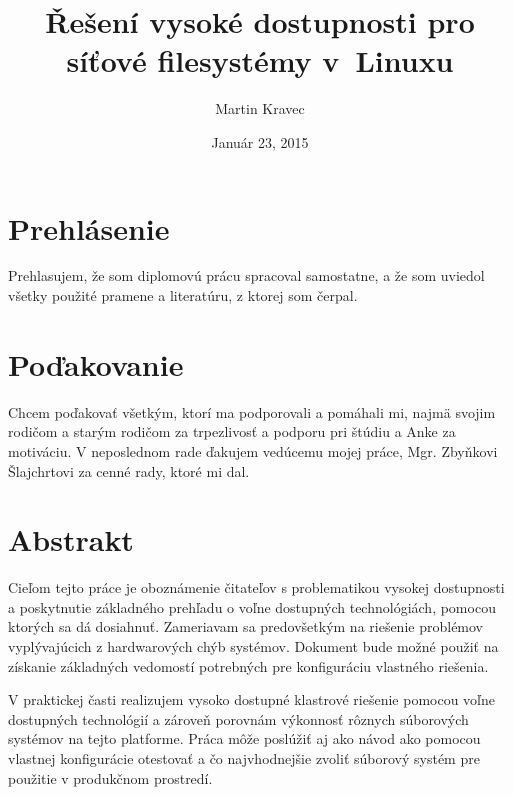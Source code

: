 \documentclass[12pt, a4paper, oneside]{book} %
\begin{document}
\title{Řešení vysoké dostupnosti pro síťové filesystémy v~Linuxu}
\author{Martin Kravec}
\date{Január 23, 2015}

\frontmatter

\maketitle \thispagestyle{empty} \emptydoublepage

\chapter*{Prehlásenie}
Prehlasujem, že som diplomovú prácu spracoval samostatne, a že som uviedol všetky použité pramene a literatúru, z ktorej som čerpal.

\emptydoublepage

\chapter*{Poďakovanie}
Chcem poďakovať všetkým, ktorí ma podporovali a pomáhali mi, najmä svojim rodičom a starým rodičom za trpezlivosť a podporu pri štúdiu a Anke za motiváciu. V neposlednom rade ďakujem vedúcemu mojej práce, Mgr. Zbyňkovi Šlajchrtovi za cenné rady, ktoré mi dal.

\emptydoublepage


\chapter*{Abstrakt}
Cieľom tejto práce je oboznámenie čitateľov s problematikou vysokej dostupnosti a poskytnutie základného prehľadu o voľne dostupných technológiách, pomocou ktorých sa dá dosiahnuť. Zameriavam sa predovšetkým na riešenie problémov vyplývajúcich z hardwarových chýb systémov. Dokument bude možné použiť na získanie základných vedomostí potrebných pre konfiguráciu vlastného riešenia.

V praktickej časti realizujem vysoko dostupné klastrové riešenie pomocou voľne dostupných technológií a zároveň porovnám výkonnosť rôznych súborových systémov na tejto platforme. Práca môže poslúžiť aj ako návod ako pomocou vlastnej konfigurácie otestovať a čo najvhodnejšie zvoliť súborový systém pre použitie v produkčnom prostredí.
\end{document}

